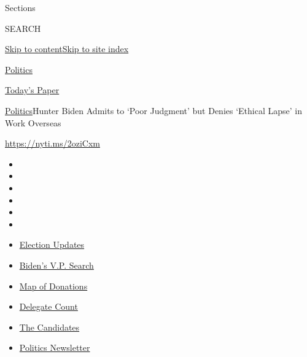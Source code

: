 Sections

SEARCH

\protect\hyperlink{site-content}{Skip to
content}\protect\hyperlink{site-index}{Skip to site index}

\href{https://www.nytimes.com/section/politics}{Politics}

\href{https://myaccount.nytimes.com/auth/login?response_type=cookie\&client_id=vi}{}

\href{https://www.nytimes.com/section/todayspaper}{Today's Paper}

\href{/section/politics}{Politics}\textbar{}Hunter Biden Admits to `Poor
Judgment' but Denies `Ethical Lapse' in Work Overseas

\url{https://nyti.ms/2oziCxm}

\begin{itemize}
\item
\item
\item
\item
\item
\item
\end{itemize}

\begin{itemize}
\item
  \href{https://www.nytimes.com/2020/07/31/us/elections/biden-vs-trump.html?action=click\&pgtype=Article\&state=default\&region=TOP_BANNER\&context=storylines_menu}{Election
  Updates}
\item
  \href{https://www.nytimes.com/article/biden-vice-president-2020.html?action=click\&pgtype=Article\&state=default\&region=TOP_BANNER\&context=storylines_menu}{Biden's
  V.P. Search}
\item
  \href{https://www.nytimes.com/interactive/2020/07/24/us/politics/trump-biden-campaign-donors.html?action=click\&pgtype=Article\&state=default\&region=TOP_BANNER\&context=storylines_menu}{Map
  of Donations}
\item
  \href{https://www.nytimes.com/interactive/2020/us/elections/delegate-count-primary-results.html?action=click\&pgtype=Article\&state=default\&region=TOP_BANNER\&context=storylines_menu}{Delegate
  Count}
\item
  \href{https://www.nytimes.com/interactive/2019/us/politics/2020-presidential-candidates.html?action=click\&pgtype=Article\&state=default\&region=TOP_BANNER\&context=storylines_menu}{The
  Candidates}
\item
  \href{https://www.nytimes.com/newsletters/politics?action=click\&pgtype=Article\&state=default\&region=TOP_BANNER\&context=storylines_menu}{Politics
  Newsletter}
\end{itemize}

